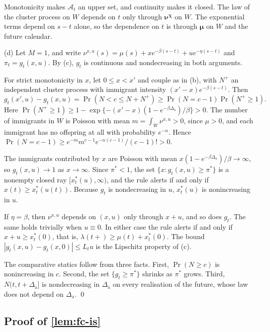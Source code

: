 Monotonicity makes $\mathcal A_t$ an upper set, and continuity makes it closed. The
law of the cluster process on $W$ depends on $t$ only through $\bm\nu^{\bm\chi}$ on $W$.
The exponential terms depend on $s-t$ alone, so the dependence on $t$ is through
$\bm\mu$ on $W$ and the future calendar.

(d) Let $M=1$, and write $\nu^{x,u}(s)=\mu(s)+xe^{-\beta(s-t)}+ue^{-\eta(s-t)}$ and
$\pi_t=g_t(x,u)$. By (c), $g_t$ is continuous and nondecreasing in both arguments.

For strict monotonicity in $x$, let $0\le x<x'$ and couple as in (b), with $N^+$ an
independent cluster process with immigrant intensity $(x'-x)e^{-\beta(s-t)}$. Then
\[
g_t(x',u)-g_t(x,u)=\Pr(N<c\le N+N^+)\ge\Pr(N=c-1)\Pr(N^+\ge1).
\]
Here $\Pr(N^+\ge1)\ge1-\exp\{-(x'-x)(1-e^{-\beta\Delta_{\mathrm a}})/\beta\}>0$. The number of
immigrants in $W$ is Poisson with mean $m=\int_W\nu^{x,u}>0$, since $\mu>0$, and each
immigrant has no offspring at all with probability $e^{-n}$. Hence
$\Pr(N=c-1)\ge e^{-m}m^{c-1}e^{-n(c-1)}/(c-1)!>0$.

The immigrants contributed by $x$ are Poisson with mean
$x(1-e^{-\beta\Delta_{\mathrm a}})/\beta\to\infty$, so $g_t(x,u)\to1$ as $x\to\infty$. Since
$\pi^*<1$, the set $\{x:g_t(x,u)\ge\pi^*\}$ is a nonempty closed ray
$[x^*_t(u),\infty)$, and the rule alerts if and only if $x(t)\ge x^*_t(u(t))$.
Because $g_t$ is nondecreasing in $u$, $x^*_t(u)$ is nonincreasing in $u$.

If $\eta=\beta$, then $\nu^{x,u}$ depends on $(x,u)$ only through $x+u$, and so does
$g_t$. The same holds trivially when $u\equiv0$. In either case the rule alerts if and
only if $x+u\ge x^*_t(0)$, that is, $\lambda(t+)\ge\mu(t)+x^*_t(0)$. The bound
$|g_t(x,u)-g_t(x,0)|\le L_tu$ is the Lipschitz property of (c).

The comparative statics follow from three facts. First, $\Pr(N\ge c)$ is nonincreasing
in $c$. Second, the set $\{g_t\ge\pi^*\}$ shrinks as $\pi^*$ grows. Third,
$N(t,t+\Delta_{\mathrm a}]$ is nondecreasing in $\Delta_{\mathrm a}$ on every realisation of the future, whose
law does not depend on $\Delta_{\mathrm a}$. \qed

\subsection{Proof of \texorpdfstring{\cref{lem:fc-is}}{the importance-weight lemma}}\label{app:fc-is}

